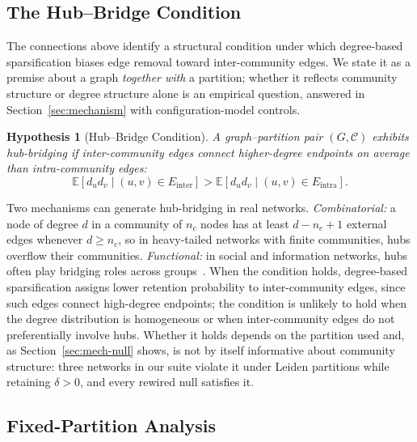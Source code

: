 \documentclass[10pt,journal,compsoc]{IEEEtran}
\newtheorem{hypothesis}{Hypothesis}
\begin{document}
\subsection{The Hub--Bridge Condition}
\label{sec:hub-bridge}

The connections above identify a structural condition under which degree-based sparsification biases edge removal toward inter-community edges. We state it as a premise about a graph \emph{together with} a partition; whether it reflects community structure or degree structure alone is an empirical question, answered in Section~\ref{sec:mechanism} with configuration-model controls.

\begin{hypothesis}[Hub--Bridge Condition]
\label{hyp:hub-bridge}
A graph--partition pair $(G, \mathcal{C})$ exhibits \emph{hub-bridging} if
inter-community edges connect higher-degree endpoints on average than
intra-community edges:
\begin{equation}
\mathbb{E}\!\left[d_u d_v \mid (u,v)\in E_{\mathrm{inter}}\right]
>
\mathbb{E}\!\left[d_u d_v \mid (u,v)\in E_{\mathrm{intra}}\right].
\label{eq:hub-bridge}
\end{equation}
\end{hypothesis}

Two mechanisms can generate hub-bridging in real networks.
\textit{Combinatorial:} a node of degree $d$ in a community of $n_c$ nodes has at least $d - n_c + 1$ external edges whenever $d \ge n_c$, so in heavy-tailed networks with finite communities, hubs overflow their communities.
\textit{Functional:} in social and information networks, hubs often play bridging roles across groups~\cite{granovetter1973strength,newman2001structure}.
When the condition holds, degree-based sparsification assigns lower retention probability to inter-community edges, since such edges connect high-degree endpoints; the condition is unlikely to hold when the degree distribution is homogeneous or when inter-community edges do not preferentially involve hubs.
Whether it holds depends on the partition used and, as Section~\ref{sec:mech-null} shows, is not by itself informative about community structure: three networks in our suite violate it under Leiden partitions while retaining $\delta > 0$, and every rewired null satisfies it.

\subsection{Fixed-Partition Analysis}
\end{document}
